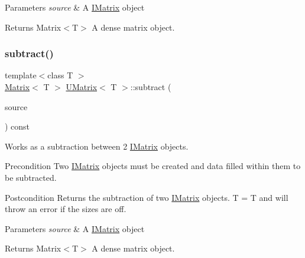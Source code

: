 \begin{DoxyParams}{Parameters}
{\em source} & A \mbox{\hyperlink{class_i_matrix}{I\+Matrix}} object \\
\hline
\end{DoxyParams}
\begin{DoxyReturn}{Returns}
Matrix$<$\+T$>$ A dense matrix object. 
\end{DoxyReturn}
\mbox{\label{class_u_matrix_af3afe64e710c05db67f5156a3759a0f1}} 
\subsubsection{\texorpdfstring{subtract()}{subtract()}\hspace{0.1cm}{\footnotesize\ttfamily [6/6]}}
{\footnotesize\ttfamily template$<$class T $>$ \\
\mbox{\hyperlink{class_matrix}{Matrix}}$<$ T $>$ \mbox{\hyperlink{class_u_matrix}{U\+Matrix}}$<$ T $>$\+::subtract (\begin{DoxyParamCaption}\item[{const \mbox{\hyperlink{class_i_matrix}{I\+Matrix}}$<$ \mbox{\hyperlink{class_d_matrix}{D\+Matrix}}$<$ T $>$, T $>$ \&}]{source }\end{DoxyParamCaption}) const}



Works as a subtraction between 2 \mbox{\hyperlink{class_i_matrix}{I\+Matrix}} objects. 

\begin{DoxyPrecond}{Precondition}
Two \mbox{\hyperlink{class_i_matrix}{I\+Matrix}} objects must be created and data filled within them to be subtracted. 
\end{DoxyPrecond}
\begin{DoxyPostcond}{Postcondition}
Returns the subtraction of two \mbox{\hyperlink{class_i_matrix}{I\+Matrix}} objects. T = T and will throw an error if the sizes are off.
\end{DoxyPostcond}

\begin{DoxyParams}{Parameters}
{\em source} & A \mbox{\hyperlink{class_i_matrix}{I\+Matrix}} object \\
\hline
\end{DoxyParams}
\begin{DoxyReturn}{Returns}
Matrix$<$\+T$>$ A dense matrix object. 
\end{DoxyReturn}
\mbox{\label{class_u_matrix_a7b8f7cc5acf42e18dcaabbc49533c6b8}} 
